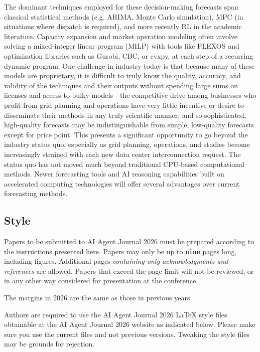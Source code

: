 \documentclass{article}
\begin{document}
The dominant techniques employed for these decision-making forecasts span classical statistical
methods (e.g. ARIMA, Monte Carlo simulation), MPC (in situations where dispatch is required), and
more recently RL in the academic literature. Capacity expansion and market operation modeling
often involve solving a mixed-integer linear program (MILP) with tools like PLEXOS and
optimization libraries such as Gurobi, CBC, or cvxpy, at each step of a recurring dynamic program.
One challenge in industry today is that because many of these models are proprietary, it is
difficult to truly know the quality, accuracy, and validity of the techniques and their outputs
without spending large sums on licenses and access to bulky models---the competitive drive among 
businesses who profit from grid planning and operations have very little incentive or desire to 
disseminate their methods in any truly scientific manner, and so sophisticated, high-quality
forecasts may be indistinguishable from simple, low-quality forecasts except for price point. This
presents a significant opportunity to go beyond the industry status quo, especially as grid
planning, operations, and studies become increasingly strained with each new data center
interconnection request. The status quo has not moved much beyond traditional CPU-based
computational methods. Newer forecasting tools and AI reasoning capabilities built on accelerated
computing technologies will offer several advantages over current forecasting methods.


\subsection{Style}


Papers to be submitted to AI Agent Journal 2026 must be prepared according to the
instructions presented here. Papers may only be up to {\bf nine} pages long,
including figures. Additional pages \emph{containing only acknowledgments and
references} are allowed. Papers that exceed the page limit will not be
reviewed, or in any other way considered for presentation at the conference.


The margins in 2026 are the same as those in previous years.


Authors are required to use the AI Agent Journal 2026 \LaTeX{} style files obtainable at the
AI Agent Journal 2026 website as indicated below. Please make sure you use the current files
and not previous versions. Tweaking the style files may be grounds for
rejection.
\end{document}
